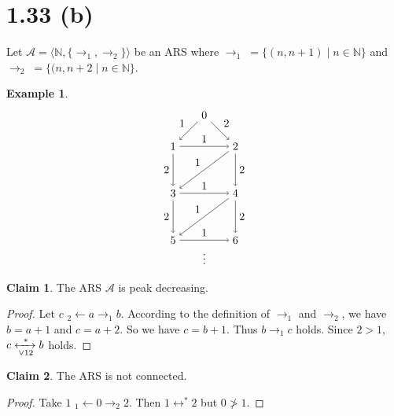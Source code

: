 \documentclass[autodetect-enginem]{article}
\theoremstyle{plain}
\theoremstyle{definition}
\newtheorem*{example}{Example}
\newtheorem*{claim*}{Claim}
\begin{document}
\section*{1.33 (b)}


Let $\mathcal{A} = \langle \mathbb{N}, \{\to_1, \to_2\} \rangle$ be an ARS
    where $\to_1\; = \{(n, n+1) \mid n \in \mathbb{N}\}$ and $\to_2 \;= \{(n, n+2 \mid n \in \mathbb{N}\}$.

\begin{example}
    \[
    \begin{tikzpicture}[auto]
        \node (0) at (0,0) {$0$};
        \node (1) at (-1,-1) {$1$}; \node (2) at (1,-1) {$2$};
        \node (3) at (-1,-2.5) {$3$}; \node (4) at (1,-2.5) {$4$};
        \node (5) at (-1,-4) {$5$}; \node (6) at (1,-4) {$6$};
        \node (vd1) at (0,-4.5) {$\vdots$};
        
        \draw[->] (0) to node[swap]{$1$} (1);
        \draw[->] (0) to node[]{$2$} (2);
        \draw[->] (1) to node[swap]{$2$} (3);
        \draw[->] (1) to node{$1$} (2);
        \draw[->] (2) to node{$2$} (4);
        \draw[->] (2) to node[swap]{$1$} (3);
        \draw[->] (3) to node{$1$} (4);
        \draw[->] (3) to node[swap]{$2$} (5);
        \draw[->] (4) to node{$2$} (6);
        \draw[->] (4) to node[swap]{$1$} (5);
        \draw[->] (5) to node{$1$} (6);
    \end{tikzpicture}
    \]
\end{example}

\begin{claim*}
    The ARS $\mathcal{A}$ is peak decreasing.
\end{claim*}

\begin{proof}
    Let $c$ $_2\!\!\leftarrow a \to_1 b$.
    According to the definition of $\to_1$ and $\to_2$, we have $b = a+1$ and $c = a+2$.
    So we have $c = b+1$. Thus $b \to_1 c$ holds.
    Since $2 > 1$, $c \xleftrightarrow[\vee 12]{*} b$ holds.
\end{proof}

\begin{claim*}
    The ARS is not connected.
\end{claim*}
\begin{proof}
    Take $1$ $_1\!\!\leftarrow 0 \to_2 2$. Then $1 \leftrightarrow^* 2$ but $0 \ngtr 1$.
\end{proof}
\end{document}
